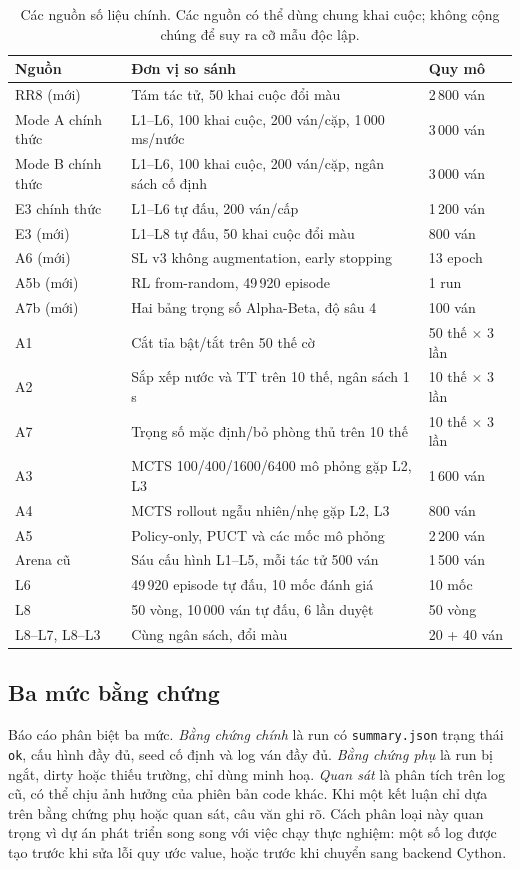 \begin{table}[H]
  \centering\small
  \caption{Các nguồn số liệu chính. Các nguồn có thể dùng chung khai cuộc; không cộng chúng để
  suy ra cỡ mẫu độc lập.}
  \label{tab:tn-nguon}
  \begin{tabularx}{\textwidth}{@{}lXl@{}}
    \toprule
    \textbf{Nguồn} & \textbf{Đơn vị so sánh} & \textbf{Quy mô} \\
    \midrule
    RR8 (mới) & Tám tác tử, 50 khai cuộc đổi màu & 2\,800 ván \\
    Mode A chính thức & L1--L6, 100 khai cuộc, 200 ván/cặp, 1\,000 ms/nước & 3\,000 ván \\
    Mode B chính thức & L1--L6, 100 khai cuộc, 200 ván/cặp, ngân sách cố định & 3\,000 ván \\
    E3 chính thức & L1--L6 tự đấu, 200 ván/cấp & 1\,200 ván \\
    E3 (mới) & L1--L8 tự đấu, 50 khai cuộc đổi màu & 800 ván \\
    A6 (mới) & SL v3 không augmentation, early stopping & 13 epoch \\
    A5b (mới) & RL from-random, 49\,920 episode & 1 run \\
    A7b (mới) & Hai bảng trọng số Alpha-Beta, độ sâu 4 & 100 ván \\
    A1 & Cắt tỉa bật/tắt trên 50 thế cờ & 50 thế $\times$ 3 lần \\
    A2 & Sắp xếp nước và TT trên 10 thế, ngân sách 1 s & 10 thế $\times$ 3 lần \\
    A7 & Trọng số mặc định/bỏ phòng thủ trên 10 thế & 10 thế $\times$ 3 lần \\
    A3 & MCTS 100/400/1600/6400 mô phỏng gặp L2, L3 & 1\,600 ván \\
    A4 & MCTS rollout ngẫu nhiên/nhẹ gặp L2, L3 & 800 ván \\
    A5 & Policy-only, PUCT và các mốc mô phỏng & 2\,200 ván \\
    Arena cũ & Sáu cấu hình L1--L5, mỗi tác tử 500 ván & 1\,500 ván \\
    L6 & 49\,920 episode tự đấu, 10 mốc đánh giá & 10 mốc \\
    L8 & 50 vòng, 10\,000 ván tự đấu, 6 lần duyệt & 50 vòng \\
    L8--L7, L8--L3 & Cùng ngân sách, đổi màu & 20 + 40 ván \\
    \bottomrule
  \end{tabularx}
\end{table}

\subsection{Ba mức bằng chứng}
Báo cáo phân biệt ba mức. \emph{Bằng chứng chính} là run có \texttt{summary.json} trạng thái
\texttt{ok}, cấu hình đầy đủ, seed cố định và log ván đầy đủ. \emph{Bằng chứng phụ} là run bị
ngắt, dirty hoặc thiếu trường, chỉ dùng minh hoạ. \emph{Quan sát} là phân tích trên log cũ,
có thể chịu ảnh hưởng của phiên bản code khác. Khi một kết luận chỉ dựa trên bằng chứng phụ
hoặc quan sát, câu văn ghi rõ. Cách phân loại này quan trọng vì dự án phát triển song song với
việc chạy thực nghiệm: một số log được tạo trước khi sửa lỗi quy ước value, hoặc trước khi
chuyển sang backend Cython.

